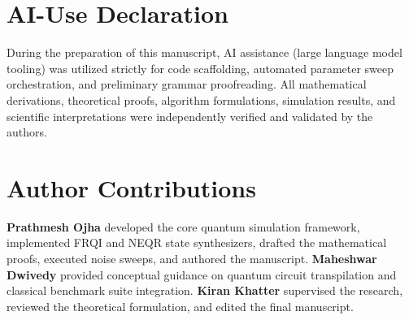 \documentclass[12pt,onecolumn,draftclsnofoot]{IEEEtran}
\begin{document}
\section*{AI-Use Declaration}
During the preparation of this manuscript, AI assistance (large language model tooling) was utilized strictly for code scaffolding, automated parameter sweep orchestration, and preliminary grammar proofreading. All mathematical derivations, theoretical proofs, algorithm formulations, simulation results, and scientific interpretations were independently verified and validated by the authors.

\section*{Author Contributions}
\textbf{Prathmesh Ojha} developed the core quantum simulation framework, implemented FRQI and NEQR state synthesizers, drafted the mathematical proofs, executed noise sweeps, and authored the manuscript. \textbf{Maheshwar Dwivedy} provided conceptual guidance on quantum circuit transpilation and classical benchmark suite integration. \textbf{Kiran Khatter} supervised the research, reviewed the theoretical formulation, and edited the final manuscript.

\FloatBarrier


\end{document}
